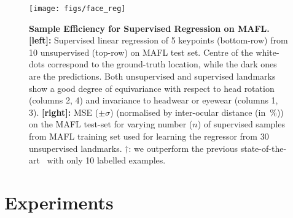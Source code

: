 \documentclass{article}
\begin{document}
\begin{figure}[t!]
\begin{minipage}{\textwidth}
  \begin{minipage}[m]{0.570\textwidth}\hbox{}%
    \texttt{[image: figs/face\_reg]}
  \end{minipage}
  \begin{minipage}[b]{0.430\textwidth}\hbox{}%
  \setlength{\tabcolsep}{1mm}
  \end{minipage}
\end{minipage}
\caption{{\bf Sample Efficiency for Supervised Regression on MAFL.}
{\bf [left]:} Supervised linear regression of 5 keypoints (bottom-row) from 10 unsupervised (top-row) on MAFL test set.
Centre of the white-dots correspond to the ground-truth location, while the dark ones are the predictions.
Both unsupervised and supervised landmarks show a good degree of equivariance with respect to head rotation (columns 2, 4) and invariance to headwear or eyewear (columns 1, 3).
{\bf [right]:} MSE ($\pm \sigma$) (normalised by inter-ocular distance (in~$\%$)) on the MAFL test-set for varying number ($n$) of supervised samples from MAFL training set used for learning the regressor from 30 unsupervised landmarks.
$\dagger$: we outperform the previous state-of-the-art~\cite{thewlis17unsupervised} with only 10 labelled examples.}\label{fig:sample-efficiency}
\end{figure}\section{Experiments}\label{s:experiments}
\end{document}
